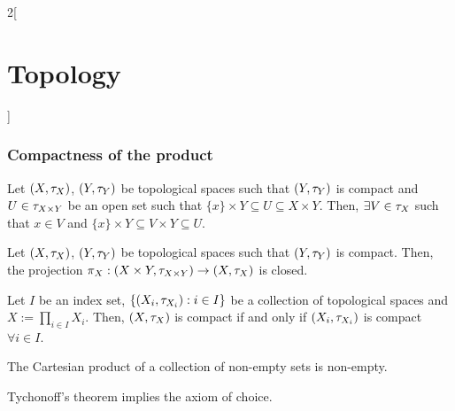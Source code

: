 \documentclass[../../../main_math.tex]{subfiles}
\begin{document}
\begin{multicols}{2}[\section{Topology}]
  \subsubsection{Compactness of the product}
  \begin{lemma}
    Let $(X,\tau_X)$, $(Y,\tau_Y)$ be topological spaces such that $(Y,\tau_Y)$ is compact and $U\in\tau_{X\times Y}$ be an open set such that $\{x\}\times Y\subseteq U\subseteq X\times Y$. Then, $\exists V\in\tau_X$ such that $x\in V$ and $\{x\}\times Y\subseteq V\times Y\subseteq U$.
  \end{lemma}
  \begin{corollary}
    Let $(X,\tau_X)$, $(Y,\tau_Y)$ be topological spaces such that $(Y,\tau_Y)$ is compact. Then, the projection $\pi_X:(X\times Y,\tau_{X\times Y})\rightarrow (X,\tau_X)$ is closed.
  \end{corollary}
  \begin{theorem}
    Let $I$ be an index set, $\{(X_i,\tau_{X_i}):i\in I\}$ be a collection of topological spaces and $X:=\prod_{i\in I}X_i$. Then, $(X,\tau_X)$ is compact if and only if $(X_i,\tau_{X_i})$ is compact $\forall i\in I$.
  \end{theorem}
  \begin{axiom}
    The Cartesian product of a collection of non-empty sets is non-empty.
  \end{axiom}
  \begin{theorem}
    Tychonoff's theorem implies the axiom of choice.
  \end{theorem}

\end{multicols}
\end{document}

